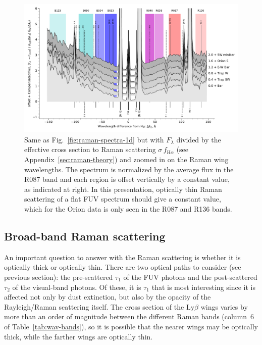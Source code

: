 \documentclass[useAMS, usenatbib, a4paper]{mnras}
\newcommand\ha{\ensuremath{\text{H}\alpha}}
\newcommand\lyb{\ensuremath{\text{Ly}\beta}}
\begin{document}
\begin{figure}
  \centering
  \includegraphics[width=\linewidth]{figs/raman-muse-spectra-compensated}
  \caption{Same as Fig.~\ref{fig:raman-spectra-1d} but with
    \(F_\lambda\) divided by the effective cross section to Raman scattering
    \(\sigma\, f_{\ha}\) (see Appendix~\ref{sec:raman-theory})
    and zoomed in on the Raman wing
    wavelengths.  The spectrum is normalized by the average flux in
    the R087 band and each region is offset vertically by a constant
    value, as indicated at right.  In this presentation, optically
    thin Raman scattering of a flat FUV spectrum should give a
    constant value, which for the Orion data is only seen in the R087
    and R136 bands.}
  \label{fig:raman-compensated}
\end{figure}

\subsection{Broad-band Raman scattering}
\label{sec:broad-band-raman}

An important question to answer with the Raman scattering is whether it is
optically thick or optically thin.
There are two optical paths to consider (see previous section):
the pre-scattered \(\tau_1\) of the FUV photons
and the post-scattered \(\tau_2\) of the visual-band photons.
Of these, it is \(\tau_1\) that is most interesting since it is affected
not only by dust extinction, but also by the opacity of the Rayleigh/Raman scattering itself.
The cross section of the \lyb{} wings varies by more than an order of magnitude
between the different Raman bands (column~6 of Table~\ref{tab:wav-bands}),
so it is possible that the nearer wings may be optically thick,
while the farther wings are optically thin. 
\end{document}
